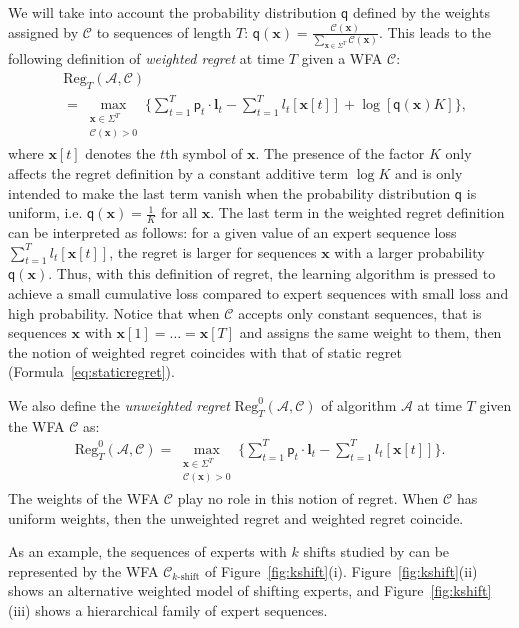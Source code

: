 \documentclass{article}
\newcommand{\sC}{\mathscr C}
\newcommand{\bfl}{{\mathbf l}}
\newcommand{\bx}{{\mathbf x}}
\newcommand{\sfp}{{\mathsf p}}
\newcommand{\sfq}{{\mathsf q}}
\newcommand{\cA}{\mathcal A}
\newcommand{\Reg}{\mathrm{Reg}}
\newcommand{\set}[2][]{#1 \{ #2 #1 \} }
\begin{document}
We will take into account the probability distribution $\sfq$ defined
by the weights assigned by $\sC$ to sequences of length $T$:
$\sfq(\bx) = \frac{\sC(\bx)}{\sum_{\bx \in \Sigma^T}
  \sC(\bx)}$. This leads to the following definition of
\emph{weighted regret} at time $T$ given a WFA $\sC$:
\begin{align}
\label{eq:weightedregret}
& \Reg_T(\cA, \sC) \\\nonumber
& = \max_{\substack{\bx \in \Sigma^T\\ \sC(\bx) > 0}} \set[\Bigg]{ \sum_{t = 1}^T \sfp_t
\cdot \bfl_t -  \sum_{t = 1}^T l_t[\bx[t]] 
  + \log [\sfq(\bx) K ] },
\end{align}
where $\bx[t]$ denotes the $t$th symbol of $\bx$.  The presence of the
factor $K$ only affects the regret definition by a constant additive
term $\log K$ and is only intended to make the last term
vanish when the probability distribution $\sfq$ is uniform, i.e.
$\sfq(\bx) = \frac{1}{K}$ for all $\bx$.  The last term in the
weighted regret definition can be interpreted as follows: for a given
value of an expert sequence loss $\sum_{t = 1}^T l_t[\bx[t]]$, the
regret is larger for sequences $\bx$ with a larger probability
$\sfq(\bx)$.  Thus, with this definition of regret, the learning
algorithm is pressed to achieve a small cumulative loss compared 
to expert sequences with small loss and high
probability. Notice that when $\sC$ accepts only constant sequences,
that is sequences $\bx$ with $\bx[1] = \ldots = \bx[T]$ and assigns
the same weight to them, then the notion of weighted regret coincides
with that of static regret (Formula~\ref{eq:staticregret}).

We also define the \emph{unweighted regret} $\Reg_T^0(\cA, \sC)$ of
algorithm $\cA$ at time $T$ given the WFA $\sC$ as:
\begin{align}
\label{eq:unweightedregret}
 \Reg_T^0(\cA, \sC) 
= \max_{\substack{\bx \in \Sigma^T\\ \sC(\bx) > 0}} \set[\Bigg]{
    \sum_{t = 1}^T \sfp_t \cdot \bfl_t - \sum_{t = 1}^T l_t[\bx[t]] }.
\end{align}
The weights of the WFA $\sC$ play no role in this notion of regret.
When $\sC$ has uniform weights, then the unweighted regret and
weighted regret coincide.

As an example, the sequences of experts with $k$ shifts studied by
\cite{HerbsterWarmuth1998} can be represented by the WFA
$\sC_\text{$k$-shift}$ of
Figure~\ref{fig:kshift}(i). Figure~\ref{fig:kshift}(ii) shows an
alternative weighted model of shifting experts, and
Figure~\ref{fig:kshift}(iii) shows a hierarchical family of expert
sequences.
\end{document}

